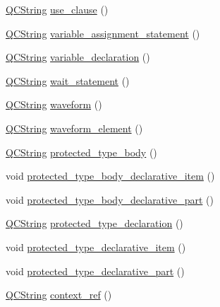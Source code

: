 \begin{DoxyCompactItemize}
\item 
\hyperlink{class_q_c_string}{Q\+C\+String} \hyperlink{classvhdl_1_1parser_1_1_vhdl_parser_a8a409c52ed4f1a94a6ed5ed8f794549d}{use\+\_\+clause} ()
\item 
\hyperlink{class_q_c_string}{Q\+C\+String} \hyperlink{classvhdl_1_1parser_1_1_vhdl_parser_a888f11198dd8ae00205ee34072e2974e}{variable\+\_\+assignment\+\_\+statement} ()
\item 
\hyperlink{class_q_c_string}{Q\+C\+String} \hyperlink{classvhdl_1_1parser_1_1_vhdl_parser_a2e4c819dc6a446b3b78c20f3c073e5ef}{variable\+\_\+declaration} ()
\item 
\hyperlink{class_q_c_string}{Q\+C\+String} \hyperlink{classvhdl_1_1parser_1_1_vhdl_parser_a6553bab5f9456bd06c1b48506a2d8a08}{wait\+\_\+statement} ()
\item 
\hyperlink{class_q_c_string}{Q\+C\+String} \hyperlink{classvhdl_1_1parser_1_1_vhdl_parser_a89efef5df51479ce9f9bc23644a3e74d}{waveform} ()
\item 
\hyperlink{class_q_c_string}{Q\+C\+String} \hyperlink{classvhdl_1_1parser_1_1_vhdl_parser_ad0c42049c4f9330529e71ca7a1057873}{waveform\+\_\+element} ()
\item 
\hyperlink{class_q_c_string}{Q\+C\+String} \hyperlink{classvhdl_1_1parser_1_1_vhdl_parser_a3c5dd6abbaf2b316870a0f63a1142c21}{protected\+\_\+type\+\_\+body} ()
\item 
void \hyperlink{classvhdl_1_1parser_1_1_vhdl_parser_a9d7e801d57bcdd0782480006933db824}{protected\+\_\+type\+\_\+body\+\_\+declarative\+\_\+item} ()
\item 
void \hyperlink{classvhdl_1_1parser_1_1_vhdl_parser_a9c5fd348c74adf65d5e8fdffb857074e}{protected\+\_\+type\+\_\+body\+\_\+declarative\+\_\+part} ()
\item 
\hyperlink{class_q_c_string}{Q\+C\+String} \hyperlink{classvhdl_1_1parser_1_1_vhdl_parser_a8224cb99a614855b853e2d21d9779f32}{protected\+\_\+type\+\_\+declaration} ()
\item 
void \hyperlink{classvhdl_1_1parser_1_1_vhdl_parser_a3cd97fec847f083f56fd10c40a7bf182}{protected\+\_\+type\+\_\+declarative\+\_\+item} ()
\item 
void \hyperlink{classvhdl_1_1parser_1_1_vhdl_parser_a3a0d603898f128c45b342c12b7838a3b}{protected\+\_\+type\+\_\+declarative\+\_\+part} ()
\item 
\hyperlink{class_q_c_string}{Q\+C\+String} \hyperlink{classvhdl_1_1parser_1_1_vhdl_parser_a282b18e630b2b1d40c7675342e423eb0}{context\+\_\+ref} ()
\item 

\end{DoxyCompactItemize}
